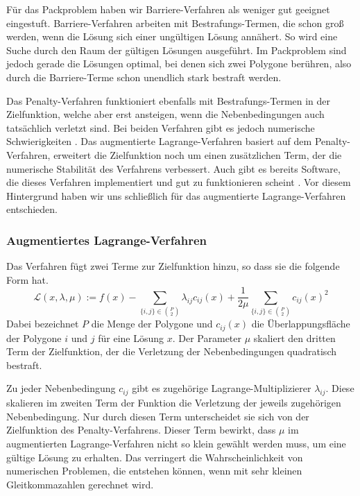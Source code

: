 \documentclass[runningheads,a4paper]{llncs}
\begin{document}
Für das Packproblem haben wir Barriere-Verfahren als weniger gut geeignet eingestuft. Barriere-Verfahren arbeiten mit Bestrafungs-Termen, die schon groß werden, wenn die Lösung sich einer ungültigen Lösung annähert. So wird eine Suche durch den Raum der gültigen Lösungen ausgeführt. Im Packproblem sind jedoch gerade die Lösungen optimal, bei denen sich zwei Polygone berühren, also durch die Barriere-Terme schon unendlich stark bestraft werden.

Das Penalty-Verfahren funktioniert ebenfalls mit Bestrafungs-Termen in der Zielfunktion, welche aber erst ansteigen, wenn die Nebenbedingungen auch tatsächlich verletzt sind. Bei beiden Verfahren gibt es jedoch numerische Schwierigkeiten \cite{nocedal1999numerical}. Das augmentierte Lagrange-Verfahren basiert auf dem Penalty-Verfahren, erweitert die Zielfunktion noch um einen zusätzlichen Term, der die numerische Stabilität des Verfahrens verbessert. Auch gibt es bereits Software, die dieses Verfahren implementiert und gut zu funktionieren scheint \cite{Conn:2010:LFP:1965037}. Vor diesem Hintergrund haben wir uns schließlich für das augmentierte Lagrange-Verfahren entschieden.

\subsubsection{Augmentiertes Lagrange-Verfahren}
Das Verfahren fügt zwei Terme zur Zielfunktion hinzu, so dass sie die folgende Form hat.
\begin{equation}
\label{eq:aug_lagrangian}
\mathcal{L}(x,\lambda,\mu) := f(x) - \sum_{\{i,j\}\in {P \choose 2}} \lambda_{ij} c_{ij}(x) + \frac{1}{2\mu}\sum_{\{i,j\}\in {P \choose 2}} c_{ij}(x)^2
\end{equation}
Dabei bezeichnet $P$ die Menge der Polygone und $c_{ij}(x)$ die Überlappungsfläche der Polygone $i$ und $j$ für eine Lösung $x$. Der Parameter $\mu$ skaliert den dritten Term der Zielfunktion, der die Verletzung der Nebenbedingungen quadratisch bestraft.

Zu jeder Nebenbedingung $c_{ij}$ gibt es zugehörige Lagrange-Multiplizierer $\lambda_{ij}$. Diese skalieren im zweiten Term der Funktion die Verletzung der jeweils zugehörigen Nebenbedingung. Nur durch diesen Term unterscheidet sie sich von der Zielfunktion des Penalty-Verfahrens. Dieser Term bewirkt, dass $\mu$ im augmentierten Lagrange-Verfahren nicht so klein gewählt werden muss, um eine gültige Lösung zu erhalten. Das verringert die Wahrscheinlichkeit von numerischen Problemen, die entstehen können, wenn mit sehr kleinen Gleitkommazahlen gerechnet wird.
\end{document}
